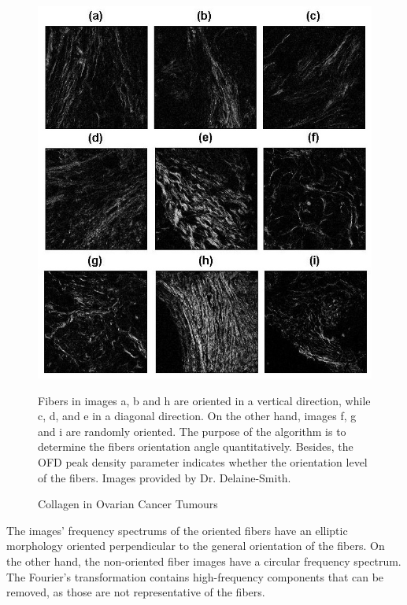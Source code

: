 \documentclass[12pt,a4paper]{article}
\begin{document}
\begin{figure}
  \includegraphics[width=\linewidth]{FiguresDisertation/figure4.jpg}
  \caption{Collagen in Ovarian Cancer Tumours }
  \medskip
  \small
  Fibers in images a, b and h are oriented in a vertical direction, while c, d, and e in a diagonal direction. On the other hand, images f, g and i are randomly oriented. The purpose of the algorithm is to determine the fibers orientation angle quantitatively. Besides, the OFD peak density parameter indicates whether the orientation level of the fibers. Images provided by Dr. Delaine-Smith.
\end{figure}

The images' frequency spectrums of the oriented fibers have an elliptic morphology oriented perpendicular to the general orientation of the fibers. On the other hand, the non-oriented fiber images have a circular frequency spectrum. The Fourier's transformation contains high-frequency components that can be removed, as those are not representative of the fibers.
\end{document}
